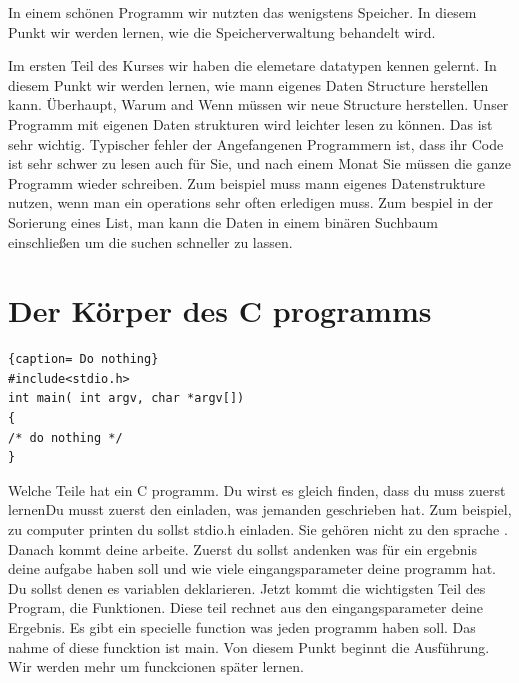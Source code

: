 \documentclass{article}[12pt]
\begin{document}
In einem sch\"onen Programm wir nutzten das wenigstens Speicher. In diesem Punkt wir werden lernen, 
wie die Speicherverwaltung behandelt wird.

Im ersten Teil des Kurses wir haben die elemetare datatypen kennen gelernt. In diesem Punkt wir
werden lernen, wie mann eigenes Daten Structure herstellen kann. Überhaupt, Warum and Wenn müssen wir neue Structure herstellen.
Unser Programm mit eigenen Daten strukturen wird leichter lesen zu können. Das ist sehr wichtig. Typischer fehler der Angefangenen Programmern
ist, dass ihr Code ist sehr schwer zu lesen auch für Sie, und nach einem Monat Sie müssen die ganze Programm
wieder schreiben. Zum beispiel muss mann eigenes Datenstrukture nutzen, wenn man ein operations sehr often erledigen muss.
Zum bespiel in der Sorierung eines List, man kann die Daten in einem binären Suchbaum einschließen um die suchen schneller zu lassen.

\section{Der Körper des C programms}

\begin{lstlisting}{caption= Do nothing}
#include<stdio.h>
int main( int argv, char *argv[])
{
/* do nothing */
}
\end{lstlisting}
Welche Teile hat ein C programm. 
Du wirst es gleich finden, dass du muss zuerst lernenDu musst zuerst den einladen, was jemanden 
geschrieben hat. Zum beispiel, zu computer printen du sollst stdio.h einladen. Sie
gehören nicht zu den sprache . Danach kommt deine arbeite. Zuerst du sollst andenken was für ein ergebnis deine aufgabe haben soll und
wie viele eingangsparameter deine programm hat. Du sollst denen es variablen deklarieren. Jetzt kommt die wichtigsten Teil des Program, die
Funktionen. Diese teil rechnet aus den eingangsparameter deine Ergebnis. Es gibt ein specielle function was jeden programm haben
soll. Das nahme of diese funcktion ist main. Von diesem Punkt beginnt die Ausführung. Wir werden mehr um funckcionen später lernen.  
\end{document}
